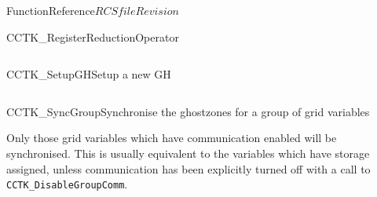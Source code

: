 \begin{cactuspart}{FunctionReference}{$RCSfile$}{$Revision$}
\begin{CCTKFunc}{CCTK\_RegisterReductionOperator}{}
\label{CCTK-RegisterReductionOperator}
\showcargs
\begin{params}
\end{params}
\begin{discussion}
\end{discussion}
\begin{examples}
\begin{tabular}{@{}p{3cm}cp{11cm}}
\end{tabular}
\end{examples}
\begin{errorcodes}
\end{errorcodes}
\end{CCTKFunc}



\begin{CCTKFunc}{CCTK\_SetupGH}{Setup a new GH}
\label{CCTK-SetupGH}
\showcargs
\begin{params}
\end{params}
\begin{discussion}
\end{discussion}
\begin{examples}
\begin{tabular}{@{}p{3cm}cp{11cm}}
\end{tabular}
\end{examples}
\begin{errorcodes}
\end{errorcodes}
\end{CCTKFunc}




\begin{CCTKFunc}{CCTK\_SyncGroup}{Synchronise the ghostzones for a group of grid variables}
\label{CCTK-SyncGroup}
\showargs
\begin{params}
\end{params}
\begin{discussion}
Only those grid variables which have communication enabled
will be synchronised. This is usually equivalent to the variables
which have storage assigned, unless communication has been explicitly
turned off with a call to {\tt CCTK\_DisableGroupComm}.


\end{discussion}
\end{CCTKFunc}
\end{cactuspart}
